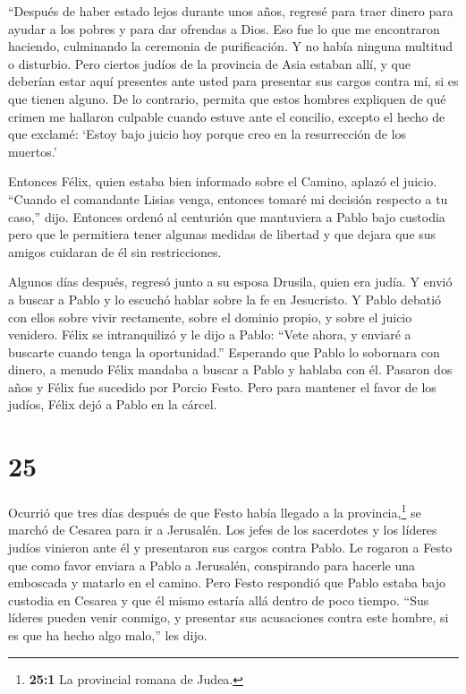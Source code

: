  ``Después de haber estado lejos durante unos años, regresé
para traer dinero para ayudar a los pobres y para dar ofrendas a Dios.
 Eso fue lo que me encontraron haciendo, culminando la
ceremonia de purificación. Y no había ninguna multitud o disturbio.
 Pero ciertos judíos de la provincia de Asia estaban allí,
y que deberían estar aquí presentes ante usted para presentar sus cargos
contra mí, si es que tienen alguno.  De lo contrario,
permita que estos hombres expliquen de qué crimen me hallaron culpable
cuando estuve ante el concilio,  excepto el hecho de que
exclamé: `Estoy bajo juicio hoy porque creo en la resurrección de los
muertos.'

 Entonces Félix, quien estaba bien informado sobre el
Camino, aplazó el juicio. ``Cuando el comandante Lisias venga, entonces
tomaré mi decisión respecto a tu caso,'' dijo.  Entonces
ordenó al centurión que mantuviera a Pablo bajo custodia pero que le
permitiera tener algunas medidas de libertad y que dejara que sus amigos
cuidaran de él sin restricciones.

 Algunos días después, regresó junto a su esposa Drusila,
quien era judía. Y envió a buscar a Pablo y lo escuchó hablar sobre la
fe en Jesucristo.  Y Pablo debatió con ellos sobre vivir
rectamente, sobre el dominio propio, y sobre el juicio venidero. Félix
se intranquilizó y le dijo a Pablo: ``Vete ahora, y enviaré a buscarte
cuando tenga la oportunidad.''  Esperando que Pablo lo
sobornara con dinero, a menudo Félix mandaba a buscar a Pablo y hablaba
con él.  Pasaron dos años y Félix fue sucedido por Porcio
Festo. Pero para mantener el favor de los judíos, Félix dejó a Pablo en
la cárcel.

\hypertarget{section-24}{%
\section{25}\label{section-24}}

 Ocurrió que tres días después de que Festo había llegado a
la provincia,\footnote{\textbf{25:1} La provincial romana de Judea.} se
marchó de Cesarea para ir a Jerusalén.  Los jefes de los
sacerdotes y los líderes judíos vinieron ante él y presentaron sus
cargos contra Pablo.  Le rogaron a Festo que como favor
enviara a Pablo a Jerusalén, conspirando para hacerle una emboscada y
matarlo en el camino.  Pero Festo respondió que Pablo estaba
bajo custodia en Cesarea y que él mismo estaría allá dentro de poco
tiempo.  ``Sus líderes pueden venir conmigo, y presentar sus
acusaciones contra este hombre, si es que ha hecho algo malo,'' les
dijo.

